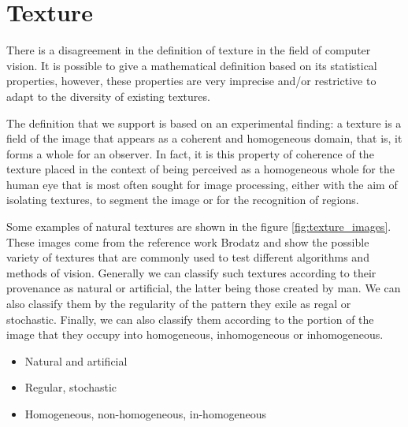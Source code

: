 \section{Texture}
There is a disagreement in the definition of texture in the field of computer vision. It is possible to give a mathematical definition based on its statistical properties, however, these properties are very imprecise and/or restrictive to adapt to the diversity of existing textures.

The definition that we support is based on an experimental finding: a texture is a field of the image that appears as a coherent and homogeneous domain, that is, it forms a whole for an observer. In fact, it is this property of coherence of the texture placed in the context of being perceived as a homogeneous whole for the human eye that is most often sought for image processing, either with the aim of isolating textures, to segment the image or for the recognition of regions.

Some examples of natural textures are shown in the figure \ref{fig:texture_images}. These images come from the reference work Brodatz and show the possible variety of textures that are commonly used to test different algorithms and methods of vision. Generally we can classify such textures according to their provenance as natural or artificial, the latter being those created by man. We can also classify them by the regularity of the pattern they exile as regal or stochastic. Finally, we can also classify them according to the portion of the image that they occupy into homogeneous, inhomogeneous or inhomogeneous.

\begin{itemize}
	\item Natural and artificial 
	\item Regular, stochastic
	\item Homogeneous, non-homogeneous, in-homogeneous
\end{itemize}

